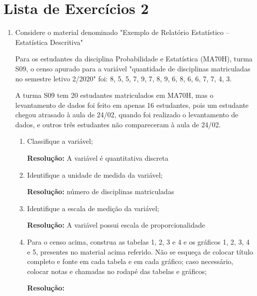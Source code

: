 \chapter{Lista de Exercícios 2}


\begin{enumerate}[label=\emph{\arabic*})]

	\item Considere o material denominado "Exemplo de Relatório Estatístico – Estatística Descritiva"

	      Para os estudantes da disciplina Probabilidade e Estatística (MA70H), turma S09, o censo apurado para a variável "quantidade de disciplinas matriculadas no semestre letivo 2/2020" foi: 8, 5, 5, 7, 9, 7, 8, 9, 6, 8, 6, 6, 7, 7, 4, 3.

	      A turma S09 tem 20 estudantes matriculados em MA70H, mas o levantamento de dados foi feito em apenas 16 estudantes, pois um estudante chegou atrasado à aula de 24/02, quando foi realizado o levantamento de dados, e outros três estudantes não compareceram à aula de 24/02.

	      \begin{enumerate}[label=\emph{\alph*})]

		      \item Classifique a variável;

		            \textbf{Resolução:}	A variável é quantitativa discreta

		      \item Identifique a unidade de medida da variável;

		            \textbf{Resolução:}	número de disciplinas matriculadas

		      \item Identifique a escala de medição da variável;

		            \textbf{Resolução:}	A variável possui escala de proporcionalidade

		      \item \label{item_graficos} Para o censo acima, construa as tabelas 1, 2, 3 e 4 e os gráficos 1, 2, 3, 4 e 5, presentes no material acima referido. Não se esqueça de colocar título completo e fonte em cada tabela e em cada gráfico; caso necessário, colocar notas e chamadas no rodapé das tabelas e gráficos;

		            \textbf{Resolução:}


\end{enumerate}
\end{enumerate}
